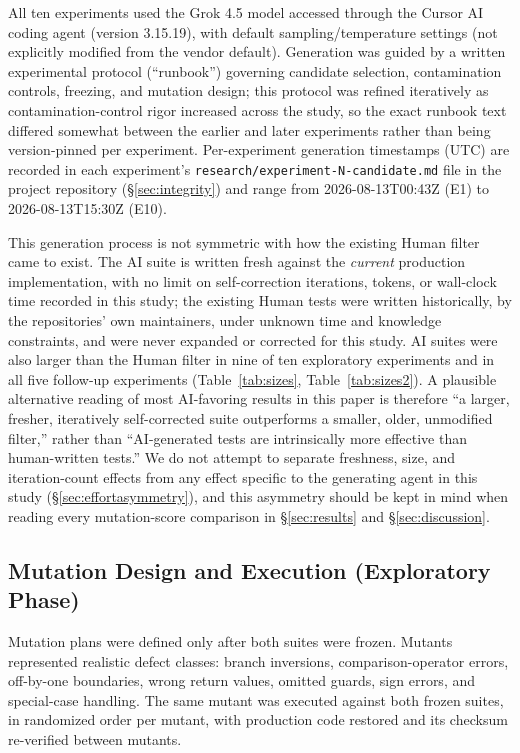\documentclass[10pt,conference]{IEEEtran}
\begin{document}
All ten experiments used the Grok 4.5 model accessed through the Cursor AI coding agent (version 3.15.19), with default sampling/temperature settings (not explicitly modified from the vendor default). Generation was guided by a written experimental protocol (``runbook'') governing candidate selection, contamination controls, freezing, and mutation design; this protocol was refined iteratively as contamination-control rigor increased across the study, so the exact runbook text differed somewhat between the earlier and later experiments rather than being version-pinned per experiment. Per-experiment generation timestamps (UTC) are recorded in each experiment's \texttt{research/experiment-N-candidate.md} file in the project repository (\S\ref{sec:integrity}) and range from 2026-08-13T00:43Z (E1) to 2026-08-13T15:30Z (E10).

This generation process is not symmetric with how the existing Human filter came to exist. The AI suite is written fresh against the \emph{current} production implementation, with no limit on self-correction iterations, tokens, or wall-clock time recorded in this study; the existing Human tests were written historically, by the repositories' own maintainers, under unknown time and knowledge constraints, and were never expanded or corrected for this study. AI suites were also larger than the Human filter in nine of ten exploratory experiments and in all five follow-up experiments (Table~\ref{tab:sizes}, Table~\ref{tab:sizes2}). A plausible alternative reading of most AI-favoring results in this paper is therefore ``a larger, fresher, iteratively self-corrected suite outperforms a smaller, older, unmodified filter,'' rather than ``AI-generated tests are intrinsically more effective than human-written tests.'' We do not attempt to separate freshness, size, and iteration-count effects from any effect specific to the generating agent in this study (\S\ref{sec:effortasymmetry}), and this asymmetry should be kept in mind when reading every mutation-score comparison in \S\ref{sec:results} and \S\ref{sec:discussion}.

\subsection{Mutation Design and Execution (Exploratory Phase)}
\label{sec:mutdesign}
Mutation plans were defined only after both suites were frozen. Mutants represented realistic defect classes: branch inversions, comparison-operator errors, off-by-one boundaries, wrong return values, omitted guards, sign errors, and special-case handling. The same mutant was executed against both frozen suites, in randomized order per mutant, with production code restored and its checksum re-verified between mutants.
\end{document}
